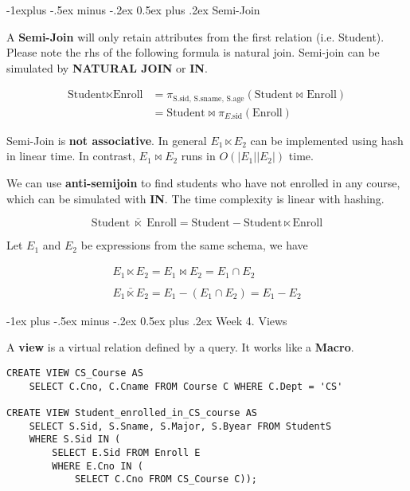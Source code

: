 \documentclass[10pt,landscape]{article}
\makeatletter
\newcommand{\term}[1]{{\color{blue} \textbf{#1}}}
\newcommand{\prpt}[1]{{\color{red} \textbf{#1}}}
\newcommand{\sql}[1]{{\color{cyan} \textbf{#1}}}
\newcommand{\semijoin}{\ensuremath{\ltimes}}
\renewcommand{\section}{\@startsection{section}{1}{0mm}%
                                {-1ex plus -.5ex minus -.2ex}%
                                {0.5ex plus .2ex}%
                                {\normalfont\large\bfseries}}
\renewcommand{\subsection}{\@startsection{subsection}{2}{0mm}%
                                {-1explus -.5ex minus -.2ex}%
                                {0.5ex plus .2ex}%
                                {\normalfont\normalsize\bfseries}}
\makeatother
\begin{document}
\begin{multicols}{4}
\subsection{Semi-Join}

A \term{Semi-Join} will only retain attributes from the first relation (i.e. Student). Please note the rhs of the following formula is natural join. Semi-join can be simulated by \sql{NATURAL JOIN} or \sql{IN}.

\begin{align*}
\text{Student}\semijoin\text{Enroll} & = \pi_{\text{S.sid, S.sname, S.age}} (\text{Student} \bowtie_{} \text{Enroll}) \\
 &= \text{Student} \bowtie \pi_{E.\text{sid}} (\text{Enroll})	
\end{align*}


Semi-Join is \prpt{not associative}. In general $E_1 \semijoin E_2$ can be implemented using hash in linear time. In contrast, $E_1 \bowtie E_2$ runs in $O(|E_1| |E_2|)$ time.

We can use \term{anti-semijoin} to find students who have not enrolled in any course, which can be simulated with \prpt{IN}. The time complexity is linear with hashing.

$$\text{Student} \;\bar{\semijoin}\; \text{Enroll} = \text{Student} - \text{Student} \semijoin \text{Enroll}$$

Let $E_1$ and $E_2$ be expressions from the same schema, we have

$$
\begin{array}{l}
E_1 \semijoin E_2 = E_1 \bowtie E_2 = E_1 \cap E_2
\\
\\
E_1 \bar{\semijoin} E_2 = E_1 - (E_1 \cap E_2) = E_1 - E_2
\end{array}
$$

\section{Week 4. Views}

A \term{view} is a virtual relation defined by a query. It works like a \prpt{Macro}.

\begin{lstlisting}
CREATE VIEW CS_Course AS
    SELECT C.Cno, C.Cname FROM Course C WHERE C.Dept = 'CS'

CREATE VIEW Student_enrolled_in_CS_course AS 
    SELECT S.Sid, S.Sname, S.Major, S.Byear FROM StudentS
    WHERE S.Sid IN (
        SELECT E.Sid FROM Enroll E
        WHERE E.Cno IN (
            SELECT C.Cno FROM CS_Course C));
\end{lstlisting}


\end{multicols}
\end{document}
